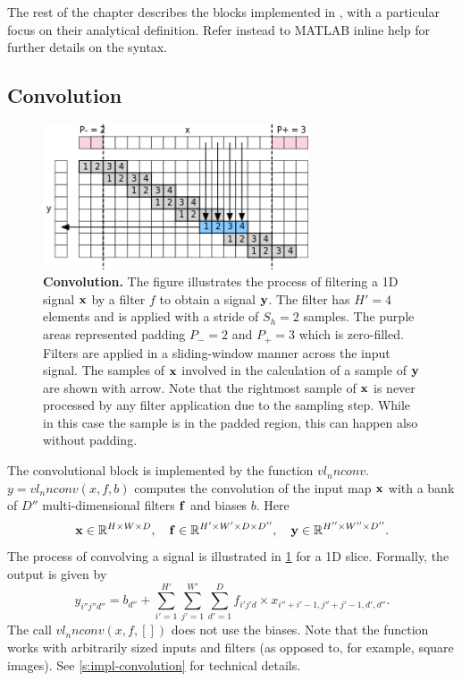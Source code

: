 The rest of the chapter describes the blocks implemented in \matconvnet, with a particular focus on their analytical definition. Refer instead to MATLAB inline help for further details on the syntax.

\subsection{Convolution}\label{s:convolution}

\begin{figure}[t]
	\centering
	\includegraphics[width=0.7\textwidth]{figures/svg/conv}
	\caption{\textbf{Convolution.} The figure illustrates the process of filtering a 1D signal $\mathbf{x}$ by a filter $f$ to obtain a signal $\mathbf{y}$. The filter has $H'=4$ elements and is applied with a stride of $S_h =2$ samples. The purple areas represented padding $P_-=2$ and $P_+=3$ which is zero-filled. Filters are applied in a sliding-window manner across the input signal. The samples of $\mathbf{x}$ involved in the calculation of a sample of $\mathbf{y}$ are shown with arrow. Note that the rightmost sample of $\mathbf{x}$  is never processed by any filter application due to the sampling step. While in this case the sample is in the padded region, this can happen also without padding.}\label{f:conv}
\end{figure}

The convolutional block is implemented by the function $vl_nnconv$. $y=vl_nnconv(x,f,b)$ computes the convolution of the input map $\mathbf{x}$ with a bank of $D''$ multi-dimensional filters $\mathbf{f}$ and biases $b$. Here
\[
\mathbf{x}\in\mathbb{R}^{H \times W \times D}, \quad
\mathbf{f}\in\mathbb{R}^{H' \times W' \times D \times D''}, \quad
\mathbf{y}\in\mathbb{R}^{H'' \times W'' \times D''}.
\]
The process of convolving a signal is illustrated in \cref{f:conv} for a 1D slice. Formally, the output is given by
\[
y_{i''j''d''}
=
b_{d''}
+
\sum_{i'=1}^{H'}
\sum_{j'=1}^{W'}
\sum_{d'=1}^D
f_{i'j'd} \times x_{i''+i'-1,j''+j'-1,d',d''}.
\]
The call $vl_nnconv(x,f,[])$ does not use the biases. Note that the function works with arbitrarily sized inputs and filters (as opposed to, for example, square images). See \cref{s:impl-convolution} for technical details.

